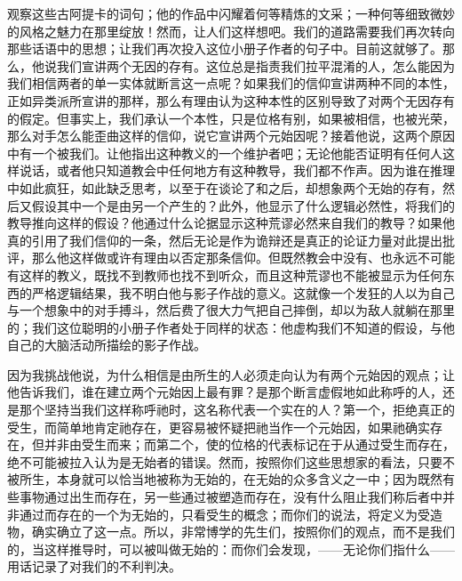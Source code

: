 观察这些古阿提卡的词句；他的作品中闪耀着何等精炼的文采；一种何等细致微妙的风格之魅力在那里绽放！然而，让人们这样想吧。我们的道路需要我们再次转向那些话语中的思想；让我们再次投入这位小册子作者的句子中。目前这就够了。那么，他说我们宣讲两个无因的存有。这位总是指责我们拉平混淆的人，怎么能因为我们相信两者的单一实体就断言这一点呢？如果我们的信仰宣讲两种不同的本性，正如异类派所宣讲的那样，那么有理由认为这种本性的区别导致了对两个无因存有的假定。但事实上，我们承认一个本性，只是位格有别，如果被相信，也被光荣，那么对手怎么能歪曲这样的信仰，说它宣讲两个元始因呢？接着他说，这两个原因中有一个被我们。让他指出这种教义的一个维护者吧；无论他能否证明有任何人这样说话，或者他只知道教会中任何地方有这种教导，我们都不作声。因为谁在推理中如此疯狂，如此缺乏思考，以至于在谈论了和之后，却想象两个无始的存有，然后又假设其中一个是由另一个产生的？此外，他显示了什么逻辑必然性，将我们的教导推向这样的假设？他通过什么论据显示这种荒谬必然来自我们的教导？如果他真的引用了我们信仰的一条，然后无论是作为诡辩还是真正的论证力量对此提出批评，那么他这样做或许有理由以否定那条信仰。但既然教会中没有、也永远不可能有这样的教义，既找不到教师也找不到听众，而且这种荒谬也不能被显示为任何东西的严格逻辑结果，我不明白他与影子作战的意义。这就像一个发狂的人以为自己与一个想象中的对手搏斗，然后费了很大力气把自己摔倒，却以为敌人就躺在那里的；我们这位聪明的小册子作者处于同样的状态：他虚构我们不知道的假设，与他自己的大脑活动所描绘的影子作战。\par

因为我挑战他说，为什么相信是由所生的人必须走向认为有两个元始因的观点；让他告诉我们，谁在建立两个元始因上最有罪？是那个断言虚假地如此称呼的人，还是那个坚持当我们这样称呼祂时，这名称代表一个实在的人？第一个，拒绝真正的受生，而简单地肯定祂存在，更容易被怀疑把祂当作一个元始因，如果祂确实存在，但并非由受生而来；而第二个，使的位格的代表标记在于从通过受生而存在，绝不可能被拉入认为是无始者的错误。然而，按照你们这些思想家的看法，只要不被所生，本身就可以恰当地被称为无始的，在无始的众多含义之一中；因为既然有些事物通过出生而存在，另一些通过被塑造而存在，没有什么阻止我们称后者中并非通过而存在的一个为无始的，只看受生的概念；而你们的说法，将定义为受造物，确实确立了这一点。所以，非常博学的先生们，按照你们的观点，而不是我们的，当这样推导时，可以被叫做无始的：而你们会发现，——无论你们指什么——用话记录了对我们的不利判决。\par

